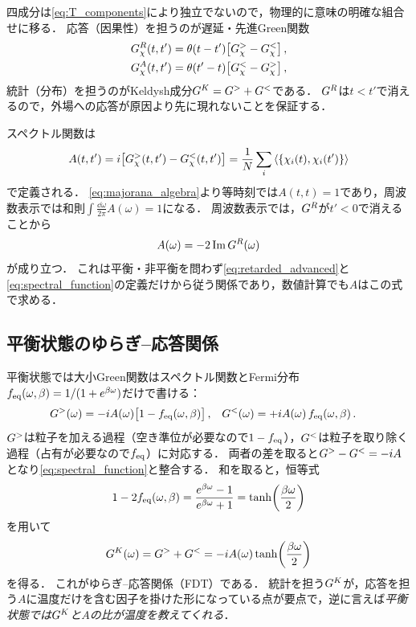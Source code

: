 \documentclass[a4paper,11pt,onecolumn]{jlreq}
\begin{document}
四成分は\eqref{eq:T_components}により独立でないので，物理的に意味の明確な組合せに移る．
応答（因果性）を担うのが遅延・先進Green関数
\begin{equation}
  \begin{aligned}
    G^{R}_\chi(t,t') &= \theta(t-t')\big[G^{>}_\chi-G^{<}_\chi\big]\,,\\
    G^{A}_\chi(t,t') &= \theta(t'-t)\big[G^{<}_\chi-G^{>}_\chi\big]\,,
  \end{aligned}
  \label{eq:retarded_advanced}
\end{equation}
統計（分布）を担うのがKeldysh成分$G^{K}=G^{>}+G^{<}$である．
$G^{R}$は$t<t'$で消えるので，外場への応答が原因より先に現れないことを保証する．

スペクトル関数は
\begin{equation}
  A(t,t') = \ii\big[\Ggtr_\chi(t,t')-\Glss_\chi(t,t')\big]
  = \frac{1}{N}\sum_i\expval{\acomm{\chi_i(t)}{\chi_i(t')}}
  \label{eq:spectral_function}
\end{equation}
で定義される．
\eqref{eq:majorana_algebra}より等時刻では$A(t,t)=1$であり，周波数表示では和則$\int\frac{\dd{\omega}}{2\pi}A(\omega)=1$になる．
周波数表示では，$G^{R}$が$t'<0$で消えることから
\begin{equation}
  A(\omega) = -2\Im G^{R}(\omega)
  \label{eq:spectral_from_retarded}
\end{equation}
が成り立つ．
これは平衡・非平衡を問わず\eqref{eq:retarded_advanced}と\eqref{eq:spectral_function}の定義だけから従う関係であり，数値計算でも$A$はこの式で求める．

\subsection{平衡状態のゆらぎ--応答関係}
\label{sec:keldysh_fdt}

平衡状態では大小Green関数はスペクトル関数とFermi分布$f_{\mathrm{eq}}(\omega,\beta)=1/(1+e^{\beta\omega})$だけで書ける：
\begin{align}
  G^{>}(\omega) &= -i A(\omega)\big[1-f_{\mathrm{eq}}(\omega,\beta)\big]\,, &
  G^{<}(\omega) &= +i A(\omega)\,f_{\mathrm{eq}}(\omega,\beta)\,.
  \label{eq:kms}
\end{align}
$G^{>}$は粒子を加える過程（空き準位が必要なので$1-f_{\mathrm{eq}}$），$G^{<}$は粒子を取り除く過程（占有が必要なので$f_{\mathrm{eq}}$）に対応する．
両者の差を取ると$G^{>}-G^{<}=-i A$となり\eqref{eq:spectral_function}と整合する．
和を取ると，恒等式
\begin{equation}
  1-2f_{\mathrm{eq}}(\omega,\beta)
  = \frac{e^{\beta\omega}-1}{e^{\beta\omega}+1}
  = \tanh\!\left(\frac{\beta\omega}{2}\right)
  \label{eq:tanh_identity}
\end{equation}
を用いて
\begin{equation}
  G^{K}(\omega) = G^{>}+G^{<} = -i A(\omega)\tanh\!\left(\frac{\beta\omega}{2}\right)
  \label{eq:fdt}
\end{equation}
を得る．
これがゆらぎ--応答関係（FDT）である．
統計を担う$G^{K}$が，応答を担う$A$に温度だけを含む因子を掛けた形になっている点が要点で，逆に言えば\emph{平衡状態では$G^{K}$と$A$の比が温度を教えてくれる}．
\end{document}
